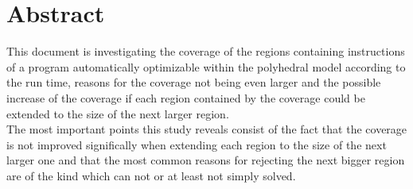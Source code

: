 \begingroup
\let\clearpage\relax
\let\cleardoublepage\relax
\let\cleardoublepage\relax

\chapter*{Abstract}
This document is investigating the coverage of the regions containing instructions of a program automatically optimizable within the polyhedral model according to the run time, reasons for the coverage not being even larger and the possible increase of the coverage if each region contained by the coverage could be extended to the size of the next larger region.\\
The most important points this study reveals consist of the fact that the coverage is not improved significally when extending each region to the size of the next larger one and that the most common reasons for rejecting the next bigger region are of the kind which can not or at least not simply solved.
\begin{comment}
    \begin{itemize}
        \item Plakative Stichworte
        \item Kalauer?
        \item Ausblick
        \item Ergebnis
    \end{itemize}
\draftnote{
    \begin{itemize}
        \item Background: Give a brief introducing notice about the motivation for conducting the study.
        \item Objective: Describe the aim of the study, including the object under examination, the focus, and the perspective.
        \item Method: Describe which research method was used to examine the object (e.g., experimental design, number and kind of participants, selection criteria, data collection and analysis procedures).
        \item Results: Describe the main findings.
        \item Limitations: Describe the major limitations of the research, if any.
        \item Conclusion: Describe the impact of the results.
        \item lengths:
            \begin{itemize}
                \item background: one sentence
                \item important elements: objective, method, result and conclusion
            \end{itemize}
        \item keywords
    \end{itemize}
}
\end{comment}


